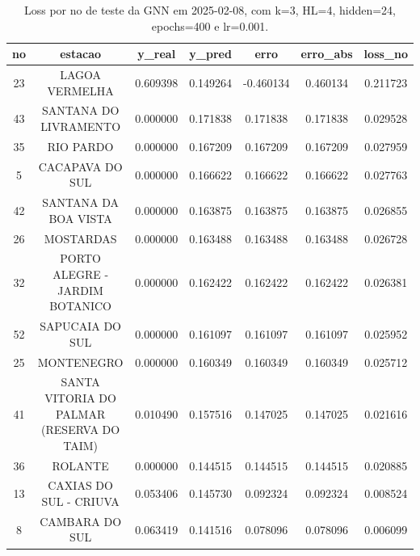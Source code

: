 \begin{table}[h]
\centering
\caption{Loss por no de teste da GNN em 2025-02-08, com k=3, HL=4, hidden=24, epochs=400 e lr=0.001.}
\label{tab:gnn_loss_k3_hl4_h24_e400_d20250208}
\begin{tabular}{ccccccc}
\toprule
no & estacao & y\_real & y\_pred & erro & erro\_abs & loss\_no \\
\midrule
23 & LAGOA VERMELHA & 0.609398 & 0.149264 & -0.460134 & 0.460134 & 0.211723 \\
43 & SANTANA DO LIVRAMENTO & 0.000000 & 0.171838 & 0.171838 & 0.171838 & 0.029528 \\
35 & RIO PARDO & 0.000000 & 0.167209 & 0.167209 & 0.167209 & 0.027959 \\
5 & CACAPAVA DO SUL & 0.000000 & 0.166622 & 0.166622 & 0.166622 & 0.027763 \\
42 & SANTANA DA BOA VISTA & 0.000000 & 0.163875 & 0.163875 & 0.163875 & 0.026855 \\
26 & MOSTARDAS & 0.000000 & 0.163488 & 0.163488 & 0.163488 & 0.026728 \\
32 & PORTO ALEGRE - JARDIM BOTANICO & 0.000000 & 0.162422 & 0.162422 & 0.162422 & 0.026381 \\
52 & SAPUCAIA DO SUL & 0.000000 & 0.161097 & 0.161097 & 0.161097 & 0.025952 \\
25 & MONTENEGRO & 0.000000 & 0.160349 & 0.160349 & 0.160349 & 0.025712 \\
41 & SANTA VITORIA DO PALMAR (RESERVA DO TAIM) & 0.010490 & 0.157516 & 0.147025 & 0.147025 & 0.021616 \\
36 & ROLANTE & 0.000000 & 0.144515 & 0.144515 & 0.144515 & 0.020885 \\
13 & CAXIAS DO SUL - CRIUVA & 0.053406 & 0.145730 & 0.092324 & 0.092324 & 0.008524 \\
8 & CAMBARA DO SUL & 0.063419 & 0.141516 & 0.078096 & 0.078096 & 0.006099 \\
\bottomrule
\end{tabular}
\end{table}
